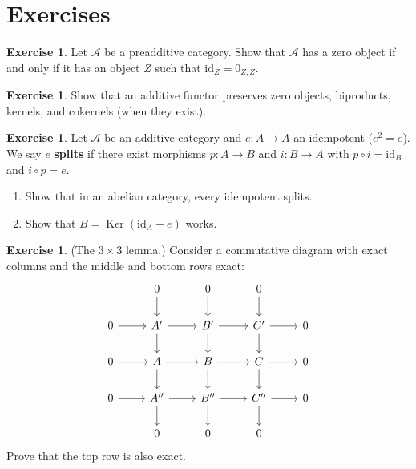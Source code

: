 \documentclass[a4paper,12pt]{book}
\DeclareMathOperator{\Ker}{Ker}
\newcommand{\id}{\mathrm{id}}
\theoremstyle{definition}
\newtheorem{exercise}[definition]{Exercise}
\theoremstyle{plain}
\theoremstyle{remark}
\begin{document}
\section{Exercises}\label{sec:abelian-exercises}

\begin{exercise}\label{exo:preadditive-zero}
Let $\mathcal{A}$ be a preadditive category. Show that $\mathcal{A}$ has a zero object if and
only if it has an object $Z$ such that $\id_Z = 0_{Z,Z}$.
\end{exercise}

\begin{exercise}\label{exo:additive-functor-zero}
Show that an additive functor preserves zero objects, biproducts, kernels, and cokernels
(when they exist).
\end{exercise}

\begin{exercise}\label{exo:idempotent-split}
Let $\mathcal{A}$ be an additive category and $e \colon A \to A$ an idempotent ($e^2 = e$).
We say $e$ \textbf{splits} if there exist morphisms $p \colon A \to B$ and $i \colon B \to A$
with $p \circ i = \id_B$ and $i \circ p = e$.
\begin{enumerate}
    \item Show that in an abelian category, every idempotent splits.
    \item Show that $B = \Ker(\id_A - e)$ works.
\end{enumerate}
\end{exercise}

\begin{exercise}\label{exo:nine-lemma}
(The $3 \times 3$ lemma.) Consider a commutative diagram with exact columns and
the middle and bottom rows exact:
\[
\begin{tikzcd}
    & 0 \arrow[d] & 0 \arrow[d] & 0 \arrow[d] & \\
    0 \arrow[r] & A' \arrow[r] \arrow[d] & B' \arrow[r] \arrow[d] & C' \arrow[r] \arrow[d] & 0 \\
    0 \arrow[r] & A \arrow[r] \arrow[d] & B \arrow[r] \arrow[d] & C \arrow[r] \arrow[d] & 0 \\
    0 \arrow[r] & A'' \arrow[r] \arrow[d] & B'' \arrow[r] \arrow[d] & C'' \arrow[r] \arrow[d] & 0 \\
    & 0 & 0 & 0 &
\end{tikzcd}
\]
Prove that the top row is also exact.
\end{exercise}
\end{document}
